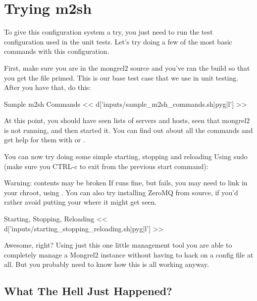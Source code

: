 \section{Trying m2sh}

To give this configuration system a try, you just need to run the test configuration used
in the unit tests.  Let's try doing a few of the most basic commands with this configuration.

First, make sure you are in the mongrel2 source and you've ran the build so that you get the
 file primed.  This is our base test case that we use in unit testing.
After you have that, do this:

\begin{code}{Sample m2sh Commands}
<< d['inputs/sample_m2sh_commands.sh|pyg|l'] >>
\end{code}

At this point, you should have seen lists of servers and hosts, seen that mongrel2 is
not running, and then started it.  You can find out about all the commands and
get help for them with  or .

You can now try doing some simple starting, stopping and reloading Using
sudo (make sure you CTRL-c to exit from the previous start command):

\begin{aside}{Warning: contents may be broken}
If  runs fine, but 
fails, you may need to link  in your chroot, using
. You can also try
installing ZeroMQ from source, if you'd rather avoid putting your 
where it might get seen.
\end{aside}


\begin{code}{Starting, Stopping, Reloading}
<< d['inputs/starting_stopping_reloading.sh|pyg|l'] >>
\end{code}

Awesome, right?  Using just this one little management tool you
are able to completely manage a Mongrel2 instance without having to hack
on a config file at all.  But you probably need to know how this is all
working anyway.


\subsection{What The Hell Just Happened?}


